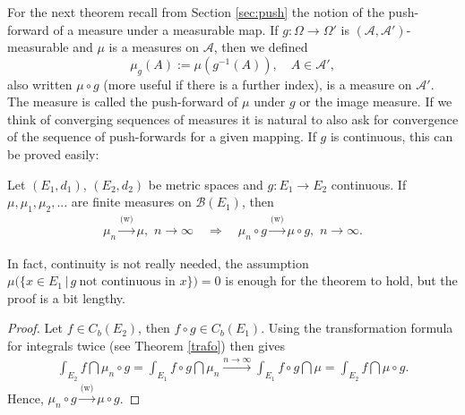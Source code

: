 For the next theorem recall from Section \ref{sec:push} the notion of the push-forward of a measure under a measurable map. If $g:\Omega \rightarrow \Omega'$ is $(\mathcal A, \mathcal A')$-measurable and $\mu$ is a measures on $\mathcal A$, then we defined $$\mu_g(A):=\mu(g^{-1}(A)),\quad A\in \mathcal A',$$ also written $\mu\circ g$ (more useful if there is a further index), is a measure on $\mathcal A'$. The measure is called the push-forward of $\mu$ under $g$ or the image measure. If we think of converging sequences of measures it is natural to also ask for convergence of the sequence of push-forwards for a given mapping. If $g$ is continuous, this can be proved easily:
\begin{lsatz}
\begin{theorem}
	Let $(E_1,d_1)$, $(E_2,d_2)$ be metric spaces and $g\colon E_1 \to E_2$ continuous.
	If $\mu,\mu_1,\mu_2,...$ are finite measures on $\mathcal B(E_1)$, then
	\begin{align*}
		 \mu_n \overset{\text{(w)}}{\rightarrow} \mu,\,\, n\to\infty\quad \Longrightarrow \quad   \mu_n\circ g \overset{\text{(w)}}{\rightarrow} \mu\circ g,\,\, n\to\infty.
	\end{align*}
\end{theorem}
\end{lsatz}
In fact, continuity is not really needed, the assumption $\mu\big( \{ x\in E_1 \,|\, g \:\text{not continuous in }x \}\big) = 0$ is enough for the theorem to hold, but the proof is a bit lengthy.
\begin{proof}[Proof]
 Let $f\in C_b(E_2)$, then $f\circ g \in C_b(E_1)$. Using the transformation formula for integrals twice (see Theorem \ref{trafo}) then gives
\begin{align*}
	\int_{E_2}f\dint \mu_n \circ g = \int_{E_1} f\circ g \dint \mu_n \overset{n\to\infty}{\longrightarrow} \int_{E_1}f\circ g \dint \mu  = \int_{E_2} f\dint \mu \circ g.
\end{align*}
Hence, $\mu_n \circ g \overset{\text{(w)}}{\rightarrow} \mu \circ g$.
\end{proof}
